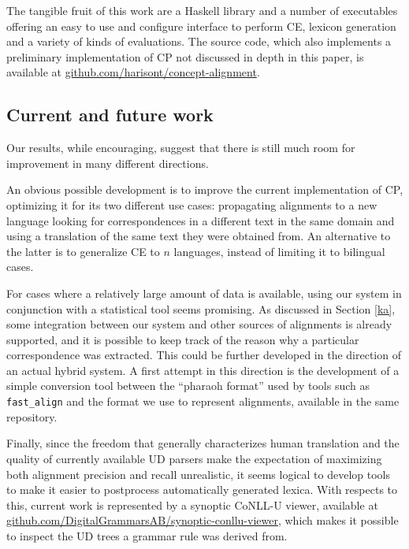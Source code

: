 \documentclass[11pt]{article}
\begin{document}
The tangible fruit of this work are a Haskell library and a number of executables offering an easy to use and configure interface to perform CE, lexicon generation and a variety of kinds of evaluations. The source code, which also implements a preliminary implementation of CP not discussed in depth in this paper, is available at \url{github.com/harisont/concept-alignment}.

\subsection{Current and future work}
Our results, while encouraging, suggest that there is still much room for improvement in many different directions.

An obvious possible development is to improve the current implementation of CP, optimizing it for its two different use cases: propagating alignments to a new language looking for correspondences in a different text in the same domain and using a translation of the same text they were obtained from. 
An alternative to the latter is to generalize CE to $n$ languages, instead of limiting it to bilingual cases.

For cases where a relatively large amount of data is available, using our system in conjunction with a statistical tool seems promising. 
As discussed in Section \ref{ka}, some integration between our system and other sources of alignments is already supported, and it is possible to keep track of the reason why a particular correspondence was extracted. 
This could be further developed in the direction of an actual hybrid system. 
A first attempt in this direction is the development of a simple conversion tool between the ``pharaoh format'' used by tools such as \texttt{fast\_align} and the format we use to represent alignments, available in the same repository.

Finally, since the freedom that generally characterizes human translation and the quality of currently available UD parsers make the expectation of maximizing both alignment precision and recall unrealistic, it seems logical to develop tools to make it easier to postprocess automatically generated lexica.
With respects to this, current work is represented by a synoptic CoNLL-U viewer, available at \url{github.com/DigitalGrammarsAB/synoptic-conllu-viewer}, which makes it possible to inspect the UD trees a grammar rule was derived from. 

  
 
\end{document}
